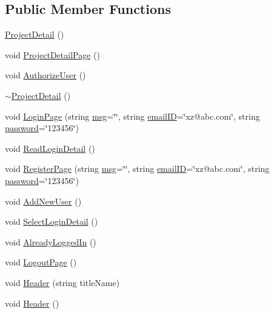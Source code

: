 \subsection*{Public Member Functions}
\begin{DoxyCompactItemize}
\item 
\hyperlink{classProjectDetail_a405e8bbc157e30c4ff93871988218d9f}{Project\-Detail} ()
\item 
void \hyperlink{classProjectDetail_ade1395ab7aed2603464d81c3c352e716}{Project\-Detail\-Page} ()
\item 
void \hyperlink{classProjectDetail_ab78c9e2a0cd5079c427638a5a3971c28}{Authorize\-User} ()
\item 
\hyperlink{classProjectDetail_ab4719d14d9efb8811916f5d691099c8f}{$\sim$\-Project\-Detail} ()
\item 
void \hyperlink{classLogin_a412b7d07f8646ef52485390c90424f5d}{Login\-Page} (string \hyperlink{classLogin_a82a917399c1459896447984f576230bb}{msg}=\char`\"{}\char`\"{}, string \hyperlink{classLogin_a3470a140651dd1afafe29f4dde99905d}{email\-I\-D}=\char`\"{}xz@abc.\-com\char`\"{}, string \hyperlink{classLogin_ac097ff5d4f32b36b3f57e8e75fcf18a7}{password}=\char`\"{}123456\char`\"{})
\item 
void \hyperlink{classLogin_ab5bc65de431f277f15a3b423ad915808}{Read\-Login\-Detail} ()
\item 
void \hyperlink{classLogin_a5c055a577da7141de9e7c65bce8d5786}{Register\-Page} (string \hyperlink{classLogin_a82a917399c1459896447984f576230bb}{msg}=\char`\"{}\char`\"{}, string \hyperlink{classLogin_a3470a140651dd1afafe29f4dde99905d}{email\-I\-D}=\char`\"{}xz@abc.\-com\char`\"{}, string \hyperlink{classLogin_ac097ff5d4f32b36b3f57e8e75fcf18a7}{password}=\char`\"{}123456\char`\"{})
\item 
void \hyperlink{classLogin_a5a2697ca2ece17b8b4cdef12b3962b95}{Add\-New\-User} ()
\item 
void \hyperlink{classLogin_ad127628ca09987d733477f90b828ad1e}{Select\-Login\-Detail} ()
\item 
void \hyperlink{classLogin_a9f4c18645f1ab1eb291f5d9f141853f4}{Already\-Logged\-In} ()
\item 
void \hyperlink{classLogin_a153d72df8d3333317e60219e8f6b8257}{Logout\-Page} ()
\item 
void \hyperlink{classInputDetail_ae55dcc0e15b85d302a09046b145330bb}{Header} (string title\-Name)
\item 
void \hyperlink{classPageLayout_a7726061f0653245f644a05807fa92472}{Header} ()
\item 

\end{DoxyCompactItemize}
